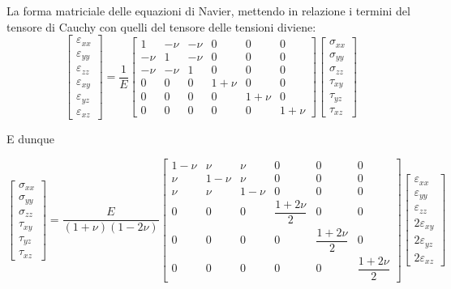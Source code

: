 \documentclass{article}
\begin{document}
\begin{adjustwidth}{2in}{}
	La forma matriciale delle equazioni di Navier, mettendo in relazione i termini del tensore di Cauchy con quelli del tensore delle tensioni diviene:
	\[
	\left[\begin{array}{c}
		\varepsilon_{xx} \\
		\varepsilon_{yy} \\
		\varepsilon_{zz} \\
		\varepsilon_{xy} \\
		\varepsilon_{yz} \\
		\varepsilon_{xz}
	\end{array} \right] = \frac{1}{E} \left[ \begin{array}{cccccc}
			1 & -\nu & -\nu & 0 & 0 & 0 \\
			-\nu & 1 & -\nu & 0 & 0 & 0 \\
			-\nu & -\nu & 1 & 0 & 0 & 0 \\
			0 & 0 & 0 & 1 + \nu & 0 & 0 \\
			0 & 0 & 0 & 0 & 1 + \nu & 0 \\
			0 & 0 & 0 & 0 & 0 & 1 + \nu
	\end{array}\right] \left[ \begin{array}{c}
		\sigma_{xx} \\
		\sigma_{yy} \\
		\sigma_{zz} \\
		\tau_{xy} \\
		\tau_{yz} \\
		\tau_{xz}
	\end{array} \right] 
	\]

	E dunque	
	
	\[
	\left[ \begin{array}{c}
		\sigma_{xx} \\
		\sigma_{yy} \\
		\sigma_{zz} \\
		\tau_{xy} \\
		\tau_{yz} \\
		\tau_{xz}
	\end{array} \right]  = \frac{E}{(1+\nu)(1-2\nu)} \left[ \begin{array}{cccccc}
		1 -\nu & \nu & \nu & 0 & 0 & 0 \\
		\nu & 1 -\nu & \nu & 0 & 0 & 0 \\
		\nu & \nu & 1 -\nu & 0 & 0 & 0 \\
		0 & 0 & 0 & \dfrac{1 + 2\nu}{2} & 0 & 0 \\
		0 & 0 & 0 & 0 & \dfrac{1 + 2\nu}{2} & 0 \\
		0 & 0 & 0 & 0 & 0 & \dfrac{1 + 2\nu}{2}
	\end{array}\right] \left[\begin{array}{c}
		\varepsilon_{xx} \\
		\varepsilon_{yy} \\
		\varepsilon_{zz} \\
		2\varepsilon_{xy} \\
		2\varepsilon_{yz} \\
		2\varepsilon_{xz}
	\end{array} \right]
	\]


\end{adjustwidth}
\end{document}
